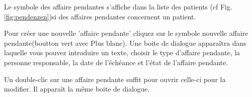 Le symbole des affaire pendantes s'affiche dans la liste des patients (cf Fig. \ref{fig:pendenzen})si des affaires pendantes concernent un patient.

Pour créer une nouvelle 'affaire pendante' cliquez sur le symbole  \glqq nouvelle affaire pendante\grqq{}(boutton vert avec Plus blanc). Une boite de dialogue apparaîtra dans laquelle vous pouvez introduire un texte, choisir le type d'affaire pendante, la personne responsable, la date de l'échéance et l'état de l'affaire pendante.
 
Un double-clic sur une affaire pendante suffit pour ouvrir celle-ci pour la modifier. Il apparaît la même boite de dialogue.


